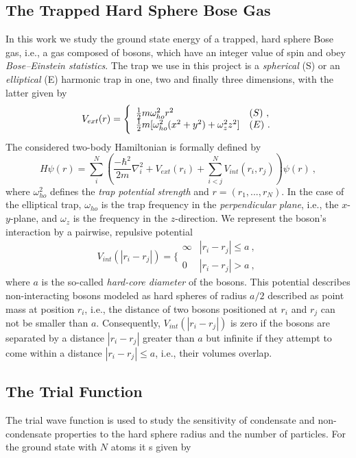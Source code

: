 \documentclass[11pt,a4paper]{article}
\numberwithin{equation}{section}
\begin{document}
\subsection{The Trapped Hard Sphere Bose Gas}
%
In this work we study the ground state energy of a trapped, hard sphere Bose gas, i.e., a gas composed of bosons, which have an integer value of spin and obey {\it Bose--Einstein statistics}.
%
The trap we use in this project is a {\it spherical} (S) or an {\it elliptical} (E) harmonic trap in one, two and finally three dimensions, with the latter given by
\begin{equation}
V_{ext}(r) = 
\Bigg\{
\begin{array}{ll}
\frac{1}{2}m\omega_{ho}^2r^2 & (S)~,\\
\strut
\frac{1}{2}m[\omega_{ho}^2(x^2+y^2) + \omega_z^2z^2] & (E)~.
\label{trap_eqn}
\end{array}
\end{equation}
The considered two-body Hamiltonian is formally defined by
\begin{equation}
H\psi(r) = \sum_i^N \left(\frac{-\hbar^2}{2m}{\nabla }_{i}^2 +V_{ext}({{r}}_i)  +
\sum_{i<j}^{N} V_{int}({{r}}_i,{{r}}_j)\right)\psi(r)~,
\end{equation}
where $\omega_{ho}^2$ defines the {\it trap potential strength} and $r = (r_1,...,r_N)$.  
%
In the case of the elliptical trap, $\omega_{ho}$ is the trap frequency in the {\it perpendicular plane}, i.e., the $x$-$y$-plane, and $\omega_z$ is the frequency in the $z$-direction.  
%
We represent the boson's interaction by a pairwise, repulsive potential
\begin{equation}
V_{int}(|{r}_i-{r}_j|) =  \Bigg\{
\begin{array}{ll}
\infty & {|{r}_i-{r}_j|} \leq {a}~,\\
0 & {|{r}_i-{r}_j|} > {a}~,
\end{array}
\end{equation}
where $a$ is the so-called {\it hard-core diameter} of the bosons.
%
This potential describes non-interacting bosons modeled as hard spheres of radius $a/2$ described as point mass at position $r_i$, i.e., the distance of two bosons positioned at $r_i$ and $r_j$ can not be smaller than $a$.   
%
Consequently, $V_{int}(|{r}_i-{r}_j|)$ is zero if the bosons are separated by a distance $|{r}_i-{r}_j|$ greater than $a$ but infinite if they attempt to come within a distance $|{r}_i-{r}_j| \leq a$, i.e., their volumes overlap.

\subsection{The Trial Function}
%
%
The trial wave function is used to study the sensitivity of condensate and non-condensate properties to the hard sphere radius and the number of particles.
%
For the ground state with $N$ atoms it s given by
\end{document}
